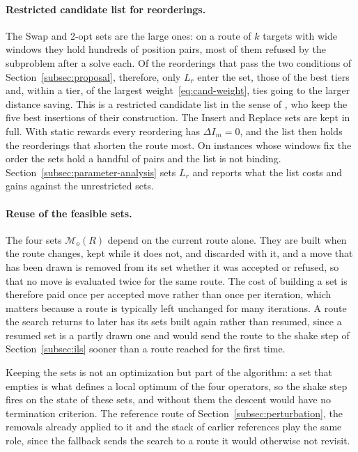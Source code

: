 \documentclass[11pt]{article}
\begin{document}
\paragraph{Restricted candidate list for reorderings.}
The Swap and 2-opt sets are the large ones: on a route of $k$ targets with wide windows they hold hundreds of position pairs, most of them refused by the subproblem after a solve each. Of the reorderings that pass the two conditions of Section~\ref{subsec:proposal}, therefore, only $L_r$ enter the set, those of the best tiers and, within a tier, of the largest weight~\eqref{eq:cand-weight}, ties going to the larger distance saving. This is a restricted candidate list in the sense of \citep{gunawan2015iterated}, who keep the five best insertions of their construction. The Insert and Replace sets are kept in full. With static rewards every reordering has $\Delta I_m = 0$, and the list then holds the reorderings that shorten the route most. On instances whose windows fix the order the sets hold a handful of pairs and the list is not binding. Section~\ref{subsec:parameter-analysis} sets $L_r$ and reports what the list costs and gains against the unrestricted sets.

\paragraph{Reuse of the feasible sets.}
The four sets $\mathcal{M}_o(R)$ depend on the current route alone. They are built when the route changes, kept while it does not, and discarded with it, and a move that has been drawn is removed from its set whether it was accepted or refused, so that no move is evaluated twice for the same route. The cost of building a set is therefore paid once per accepted move rather than once per iteration, which matters because a route is typically left unchanged for many iterations. A route the search returns to later has its sets built again rather than resumed, since a resumed set is a partly drawn one and would send the route to the shake step of Section~\ref{subsec:ils} sooner than a route reached for the first time.

Keeping the sets is not an optimization but part of the algorithm: a set that empties is what defines a local optimum of the four operators, so the shake step fires on the state of these sets, and without them the descent would have no termination criterion. The reference route of Section~\ref{subsec:perturbation}, the removals already applied to it and the stack of earlier references play the same role, since the fallback sends the search to a route it would otherwise not revisit.
\end{document}
